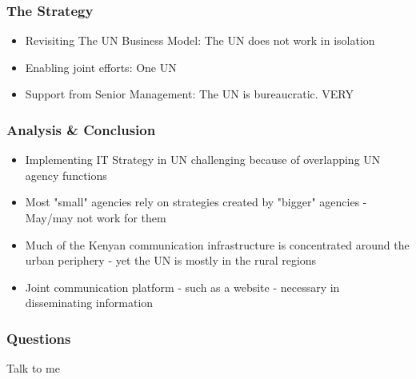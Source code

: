 \documentclass{beamer}
\begin{document}
\begin{frame}
\frametitle{The Strategy}
  \begin{itemize}
\item Revisiting The UN Business Model: The UN does not work in isolation
\item Enabling joint efforts: One UN
\item Support from Senior Management: The UN is bureaucratic. VERY
\end{itemize}
\end{frame}

\begin{frame}
\frametitle{Analysis \& Conclusion}
  \begin{itemize}
\item Implementing IT Strategy in UN challenging because of overlapping UN agency functions
\item Most "small" agencies rely on strategies created by "bigger" agencies - May/may not work for them
\item Much of the Kenyan communication infrastructure is concentrated around the urban periphery - yet the UN is mostly in the rural regions
\item Joint communication platform - such as a website - necessary in disseminating information
\end{itemize}
\end{frame}

\begin{frame}
\frametitle{Questions}
\begin{center}Talk to me\end{center}
\end{frame}
\end{document}

